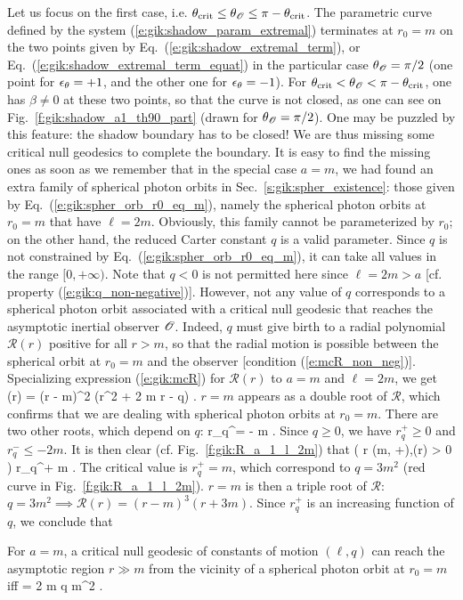 Let us focus on the first case, i.e. $\theta_{\rm crit} \leq \theta_{\mathscr{O}} \leq \pi - \theta_{\rm crit}$.
The parametric curve defined by
the system (\ref{e:gik:shadow_param_extremal}) terminates at $r_0 = m$ on the two points
given by Eq.~(\ref{e:gik:shadow_extremal_term}), or Eq.~(\ref{e:gik:shadow_extremal_term_equat})
in the particular case $\theta_{\mathscr{O}} = \pi/2$ (one point for $\epsilon_\theta=+1$, and the other one
for $\epsilon_\theta=-1$). For $\theta_{\rm crit} < \theta_{\mathscr{O}} < \pi - \theta_{\rm crit}$, one has
$\beta \neq 0$ at these two points, so that the curve is not closed, as one can see
on Fig.~\ref{f:gik:shadow_a1_th90_part} (drawn for $\theta_{\mathscr{O}} = \pi/2$).
One may be puzzled by this feature: the shadow boundary has to be closed!
We are thus missing some critical null geodesics to complete the boundary.
It is easy to find the missing ones as soon as we remember that in the
special case $a=m$, we had found an extra family of spherical photon orbits
in Sec.~\ref{s:gik:spher_existence}: those given by Eq.~(\ref{e:gik:spher_orb_r0_eq_m}),
namely the spherical photon orbits at $r_0 = m$ that have
$\ell = 2m$. Obviously, this family cannot be parameterized by $r_0$; on the other hand,
the reduced Carter constant $q$ is a valid parameter. Since $q$ is
not constrained by Eq.~(\ref{e:gik:spher_orb_r0_eq_m}), it can take all
values in the range $[0, +\infty)$. Note that $q<0$ is not permitted here
since $\ell = 2 m > a$ [cf. property (\ref{e:gik:q_non-negative})].
However, not any value of $q$ corresponds to a spherical photon orbit associated
with a critical null geodesic that reaches the asymptotic inertial observer $\mathscr{O}$.
Indeed, $q$ must give birth to a radial polynomial
$\mathcal{R}(r)$ positive for all $r > m$, so that the radial
motion is possible between the spherical orbit at $r_0=m$
 and the observer [condition (\ref{e:mcR_non_neg})].
Specializing expression (\ref{e:gik:mcR}) for $\mathcal{R}(r)$ to $a=m$ and $\ell=2m$,
we get
\be
    (r) = (r - m)^2 (r^2 + 2 m r - q) .
\ee
$r = m$ appears as a double root of $\mathcal{R}$, which confirms that we are dealing
with spherical photon orbits at $r_0 = m$. There are two other roots, which depend
on $q$:
\be \label{e:gik:root_rq}
    r_q^\pm = \pm {} - m .
\ee
Since $q\geq 0$, we have $r_q^+ \geq 0$ and $r_q^- \leq - 2m$.
It is then clear (cf. Fig.~\ref{f:gik:R_a_1_l_2m}) that
\be
     \left( \forall r \in (m, +\infty),\quad  {}(r) > 0 \right) \iff r_q^+ \leq m .
\ee
The critical value is $r_q^+ = m$, which correspond to $q = 3 m^2$ (red curve
in Fig.~\ref{f:gik:R_a_1_l_2m}). $r=m$ is then a triple root of $\mathcal{R}$:
$q = 3 m^2 \implies \mathcal{R}(r) = ( r - m)^3 (r + 3m)$. Since $r_q^+$
is an increasing function of $q$, we conclude that
\begin{greybox}
For $a=m$, a critical null geodesic
of constants of motion $(\ell, q)$ can reach the asymptotic region $r\gg m$
from the vicinity of a spherical photon orbit at $r_0 = m$ iff
\be \label{e:gik:critical_from_NHEK}
    \ell = 2 m  \leq q  m^2 .
\ee
\end{greybox}

